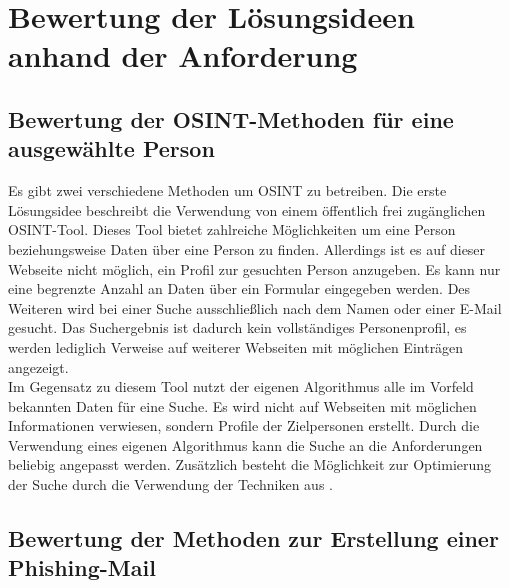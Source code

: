 

\chapter{Bewertung der Lösungsideen anhand der Anforderung}  %
\label{cha:BewertungLösungsideenAnhandAnforderung} %

\section{Bewertung der OSINT-Methoden für eine ausgewählte Person}
Es gibt zwei verschiedene Methoden um OSINT zu betreiben. Die erste Lösungsidee beschreibt die Verwendung von einem öffentlich frei zugänglichen OSINT-Tool. Dieses Tool bietet zahlreiche Möglichkeiten um eine Person beziehungsweise Daten über eine Person zu finden. Allerdings ist es auf dieser Webseite nicht möglich, ein Profil zur gesuchten Person anzugeben. Es kann nur eine begrenzte Anzahl an Daten über ein Formular eingegeben werden. Des Weiteren wird bei einer Suche ausschließlich nach dem Namen oder einer E-Mail gesucht. Das Suchergebnis ist dadurch kein vollständiges Personenprofil, es werden lediglich Verweise auf weiterer Webseiten mit möglichen Einträgen angezeigt.\\
Im Gegensatz zu diesem Tool nutzt der eigenen Algorithmus alle im Vorfeld bekannten Daten für eine Suche. Es wird nicht auf Webseiten mit möglichen Informationen verwiesen, sondern Profile der Zielpersonen erstellt. Durch die Verwendung eines eigenen Algorithmus kann die Suche an die Anforderungen beliebig angepasst werden. Zusätzlich besteht die Möglichkeit zur Optimierung der Suche durch die Verwendung der Techniken aus \cite{Bazzell}.
\section{Bewertung der Methoden zur Erstellung einer Phishing-Mail}
